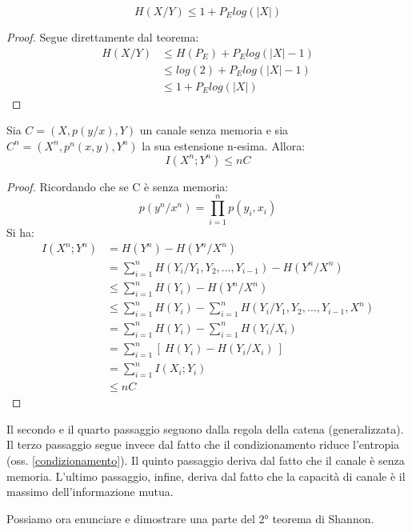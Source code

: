 \begin{corollario}
 \[
  H(X/Y) \le 1+P_E log(|X|)
 \]
\begin{proof}
 Segue direttamente dal teorema:
 \[\begin{split}
 H(X/Y) & \le H(P_E)+P_E log(|X|-1) \\
        & \le log(2) + P_E log(|X|-1) \\
        & \le 1 + P_E log(|X|)
  \end{split}
 \]
\end{proof}
\end{corollario}


\begin{lemma}
 Sia $C=(X,p(y/x),Y)$ un canale senza memoria e sia 
$C^n=(X^n,p^n(x,y),Y^n)$ la sua estensione n-esima. Allora:
\[
 I(X^n;Y^n) \le nC
\]
\begin{proof}
 \mbox{}
Ricordando che se C è senza memoria:
\[
p(y^n/x^n)=\prod_{i=1}^n p(y_i,x_i) 
\]
Si ha:
\[\begin{split}
 I(X^n;Y^n) &=H(Y^n)-H(Y^n/X^n) \\
 & = \sum_{i=1}^n H(Y_i/Y_1,Y_2,...,Y_{i-1}) - H(Y^n/X^n) \\
 & \le \sum_{i=1}^n H(Y_i) - H(Y^n/X^n) \\
 & \le \sum_{i=1}^n H(Y_i) - \sum_{i=1}^n H(Y_i/Y_1,Y_2,...,Y_{i-1},X^n) \\
 & = \sum_{i=1}^n H(Y_i) - \sum_{i=1}^n H(Y_i/X_i) \\
 & = \sum_{i=1}^n  [ \ H(Y_i)- H(Y_i/X_i) \  ] \\
 & = \sum_{i=1}^n I(X_i;Y_i) \\
 & \le nC
  \end{split}
\]
\end{proof}
Il secondo e il quarto passaggio seguono dalla regola della catena (generalizzata).
Il terzo passaggio segue invece dal fatto che il condizionamento riduce l'entropia (oss. \ref{condizionamento}).
Il quinto passaggio deriva dal fatto che il canale è senza memoria.
L'ultimo passaggio, infine, deriva dal fatto che la capacità di canale è il massimo dell'informazione mutua.
\label{lsh}
\end{lemma}


\bigskip

\noindent
Possiamo ora enunciare e dimostrare una parte del 2° teorema di Shannon.

